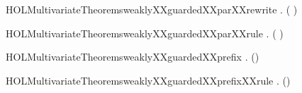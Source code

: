 \newcommand{\HOLMultivariateTheoremsweaklyXXguardedXXpar}{\UseVerbatim{HOLMultivariateTheoremsweaklyXXguardedXXpar}}
\begin{SaveVerbatim}{HOLMultivariateTheoremsweaklyXXguardedXXparXXrewrite}
\HOLTokenTurnstile{} \HOLSymConst{\HOLTokenForall{}}  .
         ( \HOLSymConst{\ensuremath{\parallel}} ) \HOLSymConst{\HOLTokenEquiv{}}
          \HOLSymConst{\HOLTokenConj{}}   
\end{SaveVerbatim}
\newcommand{\HOLMultivariateTheoremsweaklyXXguardedXXparXXrewrite}{\UseVerbatim{HOLMultivariateTheoremsweaklyXXguardedXXparXXrewrite}}
\begin{SaveVerbatim}{HOLMultivariateTheoremsweaklyXXguardedXXparXXrule}
\HOLTokenTurnstile{} \HOLSymConst{\HOLTokenForall{}}  .
          \HOLSymConst{\HOLTokenConj{}}    \HOLSymConst{\HOLTokenImp{}}
         ( \HOLSymConst{\ensuremath{\parallel}} )
\end{SaveVerbatim}
\newcommand{\HOLMultivariateTheoremsweaklyXXguardedXXparXXrule}{\UseVerbatim{HOLMultivariateTheoremsweaklyXXguardedXXparXXrule}}
\begin{SaveVerbatim}{HOLMultivariateTheoremsweaklyXXguardedXXprefix}
\HOLTokenTurnstile{} \HOLSymConst{\HOLTokenForall{}}  .   () \HOLSymConst{\HOLTokenImp{}}   
\end{SaveVerbatim}
\newcommand{\HOLMultivariateTheoremsweaklyXXguardedXXprefix}{\UseVerbatim{HOLMultivariateTheoremsweaklyXXguardedXXprefix}}
\begin{SaveVerbatim}{HOLMultivariateTheoremsweaklyXXguardedXXprefixXXrule}
\HOLTokenTurnstile{} \HOLSymConst{\HOLTokenForall{}}  .    \HOLSymConst{\HOLTokenImp{}}   ()
\end{SaveVerbatim}
